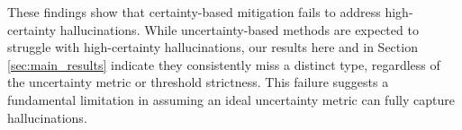 These findings show that certainty-based mitigation fails to address high-certainty hallucinations. While uncertainty-based methods are expected to struggle with high-certainty hallucinations, our results here and in Section \ref{sec:main_results} indicate they consistently miss a distinct type, regardless of the uncertainty metric or threshold strictness. This failure suggests a fundamental limitation in assuming an ideal uncertainty metric can fully capture hallucinations.





